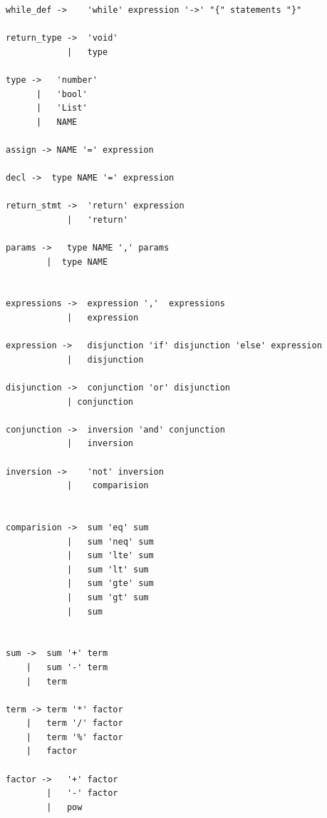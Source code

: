\begin{verbatim}
while_def ->    'while' expression '->' "{" statements "}"              

return_type ->  'void'                        
            |   type                          

type ->   'number'        
      |   'bool'          
      |   'List'          
      |   NAME            

assign -> NAME '=' expression                         

decl ->  type NAME '=' expression                              

return_stmt ->  'return' expression                                      
            |   'return'                                        

params ->   type NAME ',' params      
        |  type NAME                  


expressions ->  expression ','  expressions               
            |   expression                                

expression ->   disjunction 'if' disjunction 'else' expression            
            |   disjunction                                                

disjunction ->  conjunction 'or' disjunction                                
            | conjunction                                                   

conjunction ->  inversion 'and' conjunction                                 
            |   inversion                                                   

inversion ->    'not' inversion                                             
            |    comparision                                                


comparision ->  sum 'eq' sum                       
            |   sum 'neq' sum                      
            |   sum 'lte' sum                      
            |   sum 'lt' sum                       
            |   sum 'gte' sum                      
            |   sum 'gt' sum                       
            |   sum


sum ->  sum '+' term                            
    |   sum '-' term                            
    |   term 

term -> term '*' factor                         
    |   term '/' factor                         
    |   term '%' factor                         
    |   factor

factor ->   '+' factor
        |   '-' factor
        |   pow


\end{verbatim}
